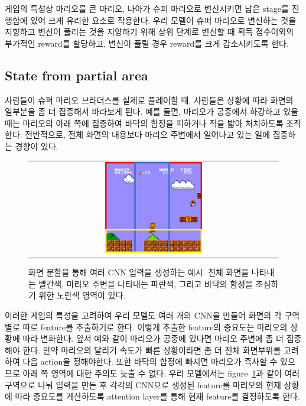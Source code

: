 게임의 특성상 마리오를 큰 마리오, 나아가 슈퍼 마리오로 변신시키면 남은 stage를 진행함에 있어 크게 유리한 요소로 작용한다.
우리 모델이 슈퍼 마리오로 변신하는 것을 지향하고 변신이 풀리는 것을 지양하기 위해 상위 단계로 변신할 때 획득 점수이외의 부가적인 reward를 할당하고, 변신이 풀릴 경우 reward를 크게 감소시키도록 한다.

\subsection{State from partial area}
사람들이 슈퍼 마리오 브라더스를 실제로 플레이할 때, 사람들은 상황에 따라 화면의 일부분을 좀 더 집중해서 바라보게 된다.
예를 들면, 마리오가 공중에서 하강하고 있을 때는 마리오의 아래 쪽에 집중하여 바닥의 함정을 피하거나 적을 밟아 처치하도록 조작한다.
전반적으로, 전체 화면의 내용보다 마리오 주변에서 일어나고 있는 일에 집중하는 경향이 있다.

\begin{figure}[]
\begin{center}
\begin{tabular}{c}
     \includegraphics[width=0.4\textwidth]{FIG/split_screen.pdf} \\
\end{tabular}
\caption{
	화면 분할을 통해 여러 CNN 입력을 생성하는 예시. 전체 화면을 나타내는 빨간색, 마리오 주변을 나타내는 파란색, 그리고 바닥의 함정을 조심하기 위한 노란색 영역이 있다.
}
\label{fig:split_screen}
\end{center}
\end{figure}

이러한 게임의 특성을 고려하여 우리 모델도 여러 개의 CNN을 만들어 화면의 각 구역별로 따로 feature를 추출하기로 한다.
이렇게 추출한 feature의 중요도는 마리오의 상황에 따라 변화한다. 앞서 예와 같이 마리오가 공중에 있다면 마리오 주변에 좀 더 집중해야 한다.
만약 마리오의 달리기 속도가 빠른 상황이라면 좀 더 전체 화면부위를 고려하여 다음 action을 정해야한다.
또한 바닥의 함정에 빠지면 마리오가 즉사할 수 있으므로 아래 쪽 영역에 대한 주의도 늦출 수 없다.
우리 모델에서는 figure~\ref{fig:split_screen}과 같이 여러 구역으로 나눠 입력을 만든 후 각각의 CNN으로 생성된 feature를 마리오의 현재 상황에 따라 중요도를 계산하도록 attention layer를 통해 현재 feature를 결정하도록 한다.


